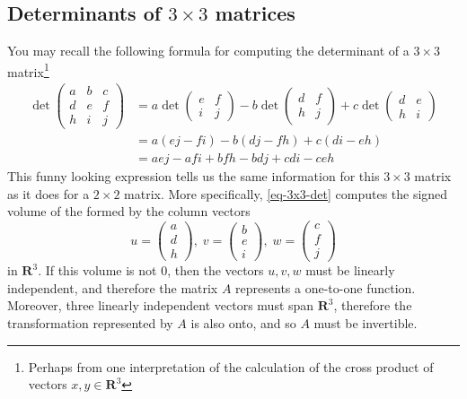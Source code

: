 \documentclass[12pt]{article}
\numberwithin{equation}{subsection}
\numberwithin{figure}{subsection}
\theoremstyle{note}
\begin{document}
\subsection{Determinants of $3\times 3$ matrices} You may recall the following formula for computing the determinant of a $3\times 3$ matrix\footnote{Perhaps from one interpretation of the calculation of the cross product of vectors $x,y\in\mathbf{R}^3$}
\begin{align} \label{eq-3x3-det} \det \begin{pmatrix} a & b & c \\ d & e & f \\ h & i & j\end{pmatrix} &= a\det \begin{pmatrix} e & f \\ i & j \end{pmatrix} - b \det \begin{pmatrix} d & f \\ h & j \end{pmatrix} + c \det\begin{pmatrix} d & e \\ h & i \end{pmatrix} \nonumber \\
&= a (ej-fi) - b(dj-fh)+c(di-eh) \nonumber \\
&= aej -afi +bfh-bdj +cdi -ceh
\end{align}
This funny looking expression tells us the same information for this $3\times 3$ matrix as it does for a $2 \times 2$ matrix. More specifically, \eqref{eq-3x3-det} computes the signed volume of the  formed by the column vectors \[ u=\begin{pmatrix} a \\ d \\ h \end{pmatrix}, \;  v=\begin{pmatrix} b \\ e \\ i \end{pmatrix},\;  w=\begin{pmatrix} c \\ f \\ j \end{pmatrix}\] in $\mathbf{R}^3$. If this volume is not 0, then the vectors $u,v,w$ must be linearly independent, and therefore the matrix $A$ represents a one-to-one function. Moreover, three linearly independent vectors must span $\mathbf{R}^3$, therefore the transformation represented by $A$ is also onto, and so $A$ must be invertible. 
\end{document}
